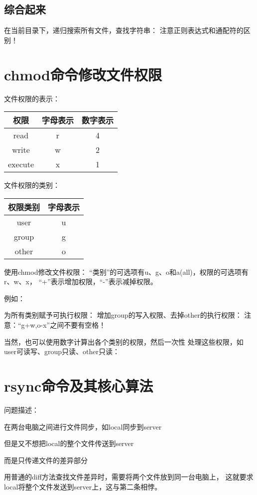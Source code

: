 ﻿\documentclass[a4paper,11pt]{article}
\begin{document}
  \subsection[综合起来]{综合起来}
  在当前目录下，递归搜索所有文件，查找字符串：
  注意正则表达式和通配符的区别！


  \section[chmod命令修改文件权限]{chmod命令修改文件权限}
  文件权限的表示：\par
  \begin{center}
  \begin{tabular}{|c|c|c|}
    \hline
    权限 & 字母表示 & 数字表示 \\\hline
    read & r & 4 \\\hline
    write & w & 2 \\\hline
    execute & x & 1 \\\hline
  \end{tabular}
  \end{center}

  文件权限的类别：\par
  \begin{center}
  \begin{tabular}{|c|c|}
    \hline
    权限类别 & 字母表示 \\\hline
    user & u \\\hline
    group & g \\\hline
    other & o \\\hline
  \end{tabular}
  \end{center}

  使用chmod修改文件权限：
  “类别”的可选项有u、g、o和a(all)，权限的可选项有r、w、x，
  “+”表示增加权限，“-”表示减掉权限。

  例如：\par
  为所有类别赋予可执行权限：
  增加group的写入权限、去掉other的执行权限：
  注意：“g+w,o-x”之间不要有空格！

  当然，也可以使用数字计算出各个类别的权限，然后一次性
  处理这些权限，如user可读写、group只读、other只读：


  \section[rsync命令及其核心算法]{rsync命令及其核心算法}
  问题描述：
  \begin{coloredenumerate}
    \item 在两台电脑之间进行文件同步，如local同步到server
    \item 但是又不想把local的整个文件传送到server
    \item 而是只传递文件的差异部分
  \end{coloredenumerate}
  用普通的diff方法查找文件差异时，需要将两个文件放到同一台电脑上，
  这就要求local将整个文件发送到server上，这与第二条相悖。
\end{document}
